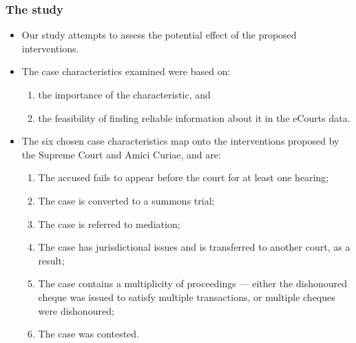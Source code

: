 \documentclass[10pt,aspectratio=169]{beamer}
\begin{document}
\begin{frame}
  \frametitle{The study}
\begin{itemize}
 \item Our study attempts to assess the potential effect of the proposed interventions.
 \item The case characteristics examined were based on:
   \begin{enumerate}
   \item the importance of the characteristic, and
   \item the feasibility of finding reliable information about it in the eCourts data.
   \end{enumerate}
 \item The six chosen case characteristics map onto the interventions proposed by the Supreme Court and Amici Curiae, and are:
   \begin{enumerate}
   \item The accused fails to appear before the court for at least one hearing;
   \item The case is converted to a summons trial;
   \item The case is referred to mediation;
   \item The case has jurisdictional issues and is transferred to another court, as a result;
   \item The case contains a multiplicity of proceedings --- either the dishonoured cheque was issued to satisfy multiple transactions, or multiple cheques were dishonoured;
   \item The case was contested.
   \end{enumerate}
\end{itemize}
\end{frame}
\end{document}

